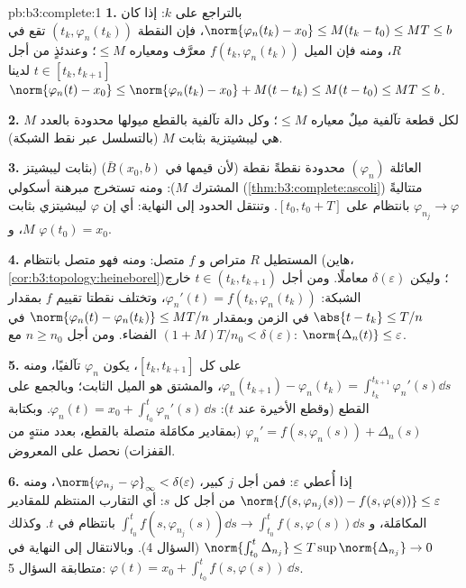 \begin{solution}{pb:b3:complete:1}
\textbf{1.} بالتراجع على $k$: إذا كان $\norm{\varphi_n(t_k) - x_0}
\leq M(t_k - t_0) \leq MT \leq b$، فإن النقطة
$(t_k,
\varphi_n(t_k))$ تقع في $R$، ومنه فإن الميل $f(t_k,
\varphi_n(t_k))$ معرَّف ومعياره
$\leq M$؛ وعندئذٍ من أجل $t \in
[t_k, t_{k+1}]$ لدينا $\norm{\varphi_n(t) - x_0} \leq
\norm{\varphi_n(t_k) - x_0} + M(t - t_k) \leq M(t - t_0) \leq
MT \leq b$.

\textbf{2.} لكل قطعة تآلفية ميلٌ معياره $\leq M$؛ وكل دالة
تآلفية بالقطع ميولها محدودة بالعدد $M$ هي ليبشيتزية بثابت $M$
(بالتسلسل عبر نقط الشبكة).

\textbf{3.} العائلة $(\varphi_n)$ محدودة نقطةً نقطة (لأن قيمها
في $\bar B(x_0, b)$)  (بثابت ليبشيتز المشترك
$M$): ومنه تستخرج مبرهنة أسكولي (\cref{thm:b3:complete:ascoli}) متتاليةً $\varphi_{n_j} \to
\varphi$
بانتظام على $[t_0, t_0 + T]$. وتنتقل الحدود إلى النهاية: أي إن
$\varphi$ ليبشيتزي بثابت $M$، و $\varphi(t_0) = x_0$.

\textbf{4.} المستطيل $R$ متراص و $f$ متصل: ومنه فهو متصل
بانتظام (هاين، \cref{cor:b3:topology:heineborel})؛ وليكن $\delta(\varepsilon)$ معاملًا. ومن أجل
$t \in (t_k,
t_{k+1})$ خارج الشبكة: $\varphi_n'(t) = f(t_k, \varphi_n(t_k))$، وتختلف نقطتا تقييم $f$ بمقدار
$\abs{t - t_k} \leq T/n$ في الزمن وبمقدار $\norm{\varphi_n(t) - \varphi_n(t_k)} \leq MT/n$ في الفضاء. ومن أجل
$n \geq n_0$ مع $(1 + M)T/n_0 < \delta(\varepsilon)$: $\norm{\Delta_n(t)} \leq \varepsilon$.

\textbf{5.} على كل $[t_k, t_{k+1}]$، يكون $\varphi_n$ تآلفيًا،
ومنه $\varphi_n(t_{k+1}) - \varphi_n(t_k) = \int_{t_k}^{t_{k+1}}
\varphi_n'(s)\dd s$، والمشتق هو الميل الثابت؛ وبالجمع على القطع (وقطع
الأخيرة عند $t$): $\varphi_n(t) = x_0 + \int_{t_0}^t\varphi_n'(s)\,\dd s$. وبكتابة $\varphi_n' = f(s, \varphi_n(s)) + \Delta_n(s)$ (بمقادير مكامَلة
متصلة بالقطع، بعدد منتهٍ من القفزات) نحصل على المعروض.

\textbf{6.} إذا أُعطي $\varepsilon$: فمن أجل $j$ كبير، $\norm{\varphi_{n_j} - \varphi}_\infty < \delta(\varepsilon)$،
ومنه $\norm{f(s, \varphi_{n_j}(s)) - f(s, \varphi(s))} \leq
\varepsilon$ من أجل كل $s$: أي التقارب المنتظم للمقادير
المكامَلة، و $\int_{t_0}^t f(s,\varphi_{n_j}(s))\dd s \to
\int_{t_0}^tf(s, \varphi(s))\dd s$ بانتظام في $t$. وكذلك $\norm{\int_{t_0}^t\Delta_{n_j}} \leq T\sup\norm{\Delta_{n_j}}
\to 0$ (السؤال 4).
وبالانتقال إلى النهاية في متطابقة السؤال 5: $\varphi(t) = x_0 + \int_{t_0}^tf(s,
\varphi(s))\,\dd s$.


\end{solution}
